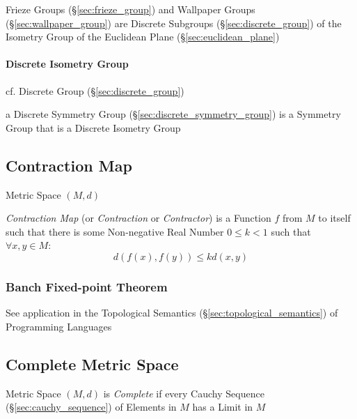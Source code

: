 Frieze Groups (\S\ref{sec:frieze_group}) and Wallpaper Groups
(\S\ref{sec:wallpaper_group}) are Discrete Subgroups
(\S\ref{sec:discrete_group}) of the Isometry Group of the Euclidean Plane
(\S\ref{sec:euclidean_plane})



\paragraph{Discrete Isometry Group}\label{sec:discrete_isometry_group}\hfill

cf. Discrete Group (\S\ref{sec:discrete_group})

a Discrete Symmetry Group (\S\ref{sec:discrete_symmetry_group}) is a Symmetry
Group that is a Discrete Isometry Group



\subsection{Contraction Map}\label{sec:contraction_map}

Metric Space $(M,d)$

\emph{Contraction Map} (or \emph{Contraction} or \emph{Contractor}) is
a Function $f$ from $M$ to itself such that there is some Non-negative
Real Number $0 \leq k < 1$ such that $\forall x,y \in M$:
\[
  d(f(x),f(y)) \leq k d(x,y)
\]



\subsubsection{Banch Fixed-point Theorem}\label{sec:banach_fixedpoint}

\fist See application in the Topological Semantics
(\S\ref{sec:topological_semantics}) of Programming Languages



\subsection{Complete Metric Space}\label{sec:complete_metric_space}

Metric Space $(M,d)$ is \emph{Complete} if every Cauchy Sequence
(\S\ref{sec:cauchy_sequence}) of Elements in $M$ has a Limit in $M$

